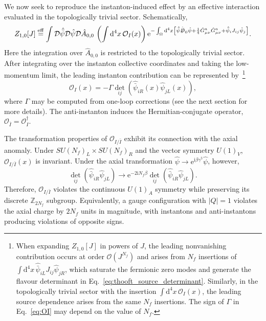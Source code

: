\documentclass[review]{elsarticle}
\numberwithin{equation}{section}
\numberwithin{table}{section}
\numberwithin{figure}{section}
\def\d{\mathrm{d}}
\def\O{\mathcal{O}}
\def\i{\mathrm{i}}
\def\e{\mathrm{e}}
\begin{document}
We now seek to reproduce the instanton-induced effect by an effective interaction evaluated in the topologically trivial sector. Schematically,
\begin{align}
    Z_{1,0}[J] 
    \overset{\rm eff}{=} 
    \int\mathcal{D}\hat{\bar\psi} \mathcal{D}\hat\psi\mathcal{D}\hat A_{0,0}
    \,\left(\int\d^4 x\,\O_{I}(x)\right)
    \e^{-\int_\Omega \d^4x \left[\hat{\bar\psi}\hat{\slashed{D}}_0 \hat\psi+\frac{1}{4}\hat G_{\mu\nu}^a\hat G_{\mu\nu}^a +\hat{\bar\psi}_i J_{ij}\hat\psi_j\right]}.\label{eq:thooft_effective_matching}
\end{align}
Here the integration over $\hat A_{0,0}$ is restricted to the topologically trivial sector. After integrating over the instanton collective coordinates and taking the low-momentum limit, the leading instanton contribution can be represented by~\cite{tHooft:1976rip}\footnote{When expanding $Z_{1,0}[J]$ in powers of $J$, the leading nonvanishing contribution occurs at order $\O(J^{N_f})$ and arises from $N_f$ insertions of $\int\d^4x\,\hat{\bar\psi}_{iL}J_{ij}\hat\psi_{jR}$, which saturate the fermionic zero modes and generate the flavour determinant in Eq.~\eqref{eq:thooft_source_determinant}. Similarly, in the topologically trivial sector with the insertion $\int\d^4x\,\O_I(x)$, the leading source dependence arises from the same $N_f$ insertions. The sign of $\Gamma$ in Eq.~\eqref{eq:OI} may depend on the value of $N_f$. }
\begin{equation}
    \O_{I}(x) = -\Gamma\det_{ij}\left(\hat{\bar\psi}_{iR}(x)\hat\psi_{jL}(x) \right), 
    \label{eq:OI}
\end{equation}
where $\Gamma$ may be computed from one-loop corrections (see the next section for more details).
The anti-instanton induces the Hermitian-conjugate operator, $\O_{\bar I}=\O_{I}^\dagger$.


The transformation properties of $\O_{I/\bar I}$ exhibit its connection with the axial anomaly. Under $SU(N_f)_L\times SU(N_f)_R$ and the vector symmetry $U(1)_V$, $\O_{I/\bar I}(x)$ is invariant. Under the axial transformation $\hat\psi\rightarrow\e^{\i\beta\gamma^5}\hat\psi$, however,
\begin{equation}
    \det_{ij}\left(\hat{\bar\psi}_{iR}\hat\psi_{jL} \right) \rightarrow \e^{-2\i N_f\beta}\det_{ij}\left(\hat{\bar\psi}_{iR}\hat\psi_{jL}\right).
    \label{eq:thooft_U1A_violation}
\end{equation}
Therefore, $\O_{I/\bar{I}}$ violates the continuous $U(1)_A$ symmetry while preserving its discrete $\mathbb{Z}_{2N_f}$ subgroup. Equivalently, a gauge configuration with $|Q|=1$ violates the axial charge by $2N_f$ units in magnitude, with instantons and anti-instantons producing violations of opposite signs.
\end{document}

